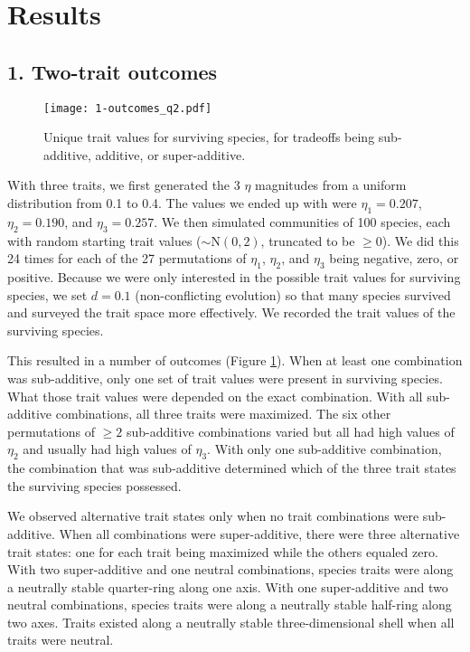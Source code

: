 \section*{Results}

\subsection*{1. Two-trait outcomes}








\begin{figure}[ht!]
\centering
\texttt{[image: 1-outcomes\_q2.pdf]}
\caption{Unique trait values for surviving species, for tradeoffs
    being sub-additive, additive, or super-additive.}
\label{fig:two-trait-outcomes}
\end{figure}



With three traits, we first generated the 3 $\eta$ magnitudes from a
uniform distribution from 0.1 to 0.4.
The values we ended up with were
$\eta_1 = 0.207$, $\eta_2 = 0.190$, and $\eta_3 = 0.257$.
We then simulated communities of 100 species, each with random starting
trait values ($\sim \text{N}(0, 2)$, truncated to be $\ge 0$).
We did this 24 times for each of the 27 permutations of
$\eta_1$, $\eta_2$, and $\eta_3$ being negative, zero, or positive.
Because we were only interested in the possible trait values for surviving
species, we set $d = 0.1$ (non-conflicting evolution) so that many species
survived and surveyed the trait space more effectively.
We recorded the trait values of the surviving species.


This resulted in a number of outcomes (Figure \ref{fig:two-trait-outcomes}).
When at least one combination was sub-additive, only one set of trait
values were present in surviving species.
What those trait values were depended on the exact combination.
With all sub-additive combinations, all three traits were maximized.
The six other permutations of $\ge 2$ sub-additive combinations varied but
all had high values of $\eta_2$ and usually had high values of $\eta_3$.
With only one sub-additive combination, the combination that was sub-additive
determined which of the three trait states the surviving species possessed.


We observed alternative trait states only when no trait combinations
were sub-additive.
When all combinations were super-additive, there were three alternative
trait states: one for each trait being maximized while the others
equaled zero.
With two super-additive and one neutral combinations, species traits were
along a neutrally stable quarter-ring along one axis.
With one super-additive and two neutral combinations, species traits were
along a neutrally stable half-ring along two axes.
Traits existed along a neutrally stable three-dimensional shell when all
traits were neutral.



